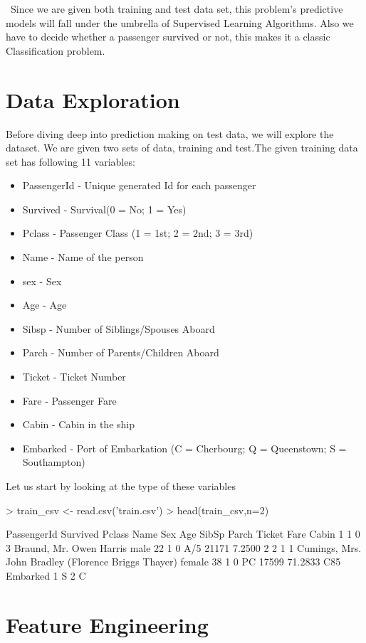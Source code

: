 \documentclass[a4paper,10pt]{report}
\begin{document}
\ Since we are given both training and test data set, this problem's predictive models will fall under the umbrella of Supervised Learning Algorithms. Also we have to decide whether a passenger survived or not, this makes it a classic Classification problem.

\section*{Data Exploration}
Before diving deep into prediction making on test data, we will explore the dataset. We are given two sets of data, training and test.The given training data set has following 11 variables:
\begin{itemize}
  \item PassengerId - Unique generated Id for each passenger
  \item Survived - Survival(0 = No; 1 = Yes)
  \item Pclass - Passenger Class (1 = 1st; 2 = 2nd; 3 = 3rd)
  \item Name - Name of the person
  \item sex - Sex 
  \item Age - Age
  \item Sibsp - Number of Siblings/Spouses Aboard
  \item Parch - Number of Parents/Children Aboard
  \item Ticket - Ticket Number
  \item Fare - Passenger Fare
  \item Cabin - Cabin in the ship
  \item Embarked - Port of Embarkation (C = Cherbourg; Q = Queenstown; S = Southampton)
  
\end{itemize}

Let us start by looking at the type of these variables
\begin{Schunk}
\begin{Sinput}
> train_csv <- read.csv('train.csv')
> head(train_csv,n=2)
\end{Sinput}
\begin{Soutput}
  PassengerId Survived Pclass                                                Name    Sex Age SibSp Parch    Ticket    Fare Cabin
1           1        0      3                             Braund, Mr. Owen Harris   male  22     1     0 A/5 21171  7.2500      
2           2        1      1 Cumings, Mrs. John Bradley (Florence Briggs Thayer) female  38     1     0  PC 17599 71.2833   C85
  Embarked
1        S
2        C
\end{Soutput}
\end{Schunk}

\section*{Feature Engineering}
\end{document}
